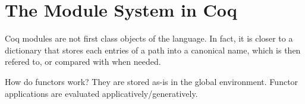 \chapter{The Module System in Coq}
Coq modules are not first class objects of the language. In fact, it is closer
to a dictionary that stores each entries of a path into a canonical name, which
is then refered to, or compared with when needed. 

How do functors work? They are stored as-is in the global environment. Functor 
applications are evaluated applicatively/generatively.
